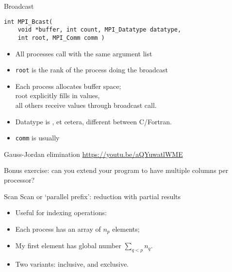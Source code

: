 \begin{numberedframe}{Broadcast}
\begin{lstlisting}
int MPI_Bcast(
    void *buffer, int count, MPI_Datatype datatype, 
    int root, MPI_Comm comm )
\end{lstlisting}
\begin{itemize}
\item All processes call with the same argument list
\item \lstinline{root} is the rank of the process doing the broadcast
\item Each process allocates buffer space;\\
  root explicitly fills in values,\\
  all others receive values through broadcast call.
\item Datatype is ,  et cetera, different
  between C/Fortran.
\item \lstinline{comm} is usually 
\end{itemize}
\end{numberedframe}

\begin{numberedframe}{Gauss-Jordan elimination}
  \url{https://youtu.be/aQYuwatlWME}
\end{numberedframe}

\begin{exerciseframe}[jordan]
  \small
  
\end{exerciseframe}

\begin{optexerciseframe}
  Bonus exercise: can you extend your program to have multiple columns
  per processor?
\end{optexerciseframe}


\begin{numberedframe}{Scan}
Scan or `parallel prefix': reduction with partial results

\begin{itemize}
\item Useful for indexing operations:
\item Each process has an array of $n_p$ elements;
\item My first element has global number $\sum_{q<p}n_q$.
\item Two variants:  inclusive, and
   exclusive.
\end{itemize}
\end{numberedframe}

